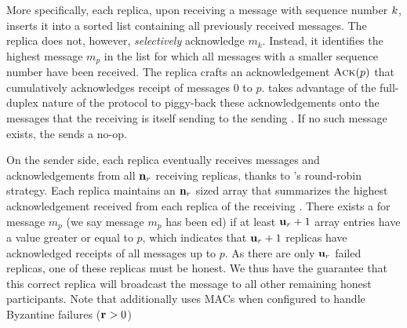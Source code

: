 More specifically, each replica, upon receiving a message with sequence number $k$, inserts it into a sorted list containing all previously received messages. The replica does not, however, \textit{selectively} acknowledge $m_k$. Instead, it identifies the highest message $m_p$ in the list for which all messages with a smaller sequence number have been received. The replica crafts an acknowledgement $\textsc{Ack}(p)$ that cumulatively acknowledges receipt of messages $0$ to $p$. \Scrooge{} takes advantage of the full-duplex nature of the protocol to piggy-back these acknowledgements onto the messages that the receiving \RSM{} is itself sending to the sending \RSM{}. If no such message exists, the \RSM{} sends a no-op.

On the sender side, each replica eventually receives messages and acknowledgements from all $\textbf{n}_{r}$ receiving replicas, thanks to \Scrooge{}'s round-robin strategy.  Each replica maintains an $\textbf{n}_{r}$ sized array that summarizes the highest acknowledgement received from each replica of the receiving \RSM{}. There exists a \quack{} for message $m_p$ (we say message $m_p$ has been \quack{}ed) if at least $\textbf{u}_{r} + 1$ array entries have a value greater or equal to $p$, which indicates that $\textbf{u}_{r}+1$ replicas have acknowledged receipts of all messages up to $p$. As there are only $\textbf{u}_{r}$ failed replicas, one of these replicas must be honest. We thus have the guarantee that this correct replica will broadcast the message to all other remaining honest participants. Note that \Scrooge{} additionally uses MACs when configured to handle Byzantine failures ($\textbf{r}_{}>0$)
%
%

